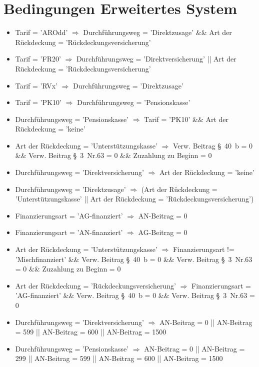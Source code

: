 \normalsize

\section{Bedingungen Erweitertes System}\label{sec:bedingungenComplex}

\footnotesize

\begin{itemize}
\item Tarif = 'AROdd' $\Rightarrow$ Durchführungsweg = 'Direktzusage' \&\& Art der Rückdeckung = 'Rückdeckungsversicherung'
\item Tarif = 'FR20' $\Rightarrow$ Durchführungsweg = 'Direktversicherung' || Art der Rückdeckung = 'Rückdeckungsversicherung'
\item Tarif = 'RVx' $\Rightarrow$ Durchführungsweg = 'Direktzusage'
\item Tarif = 'PK10' $\Rightarrow$ Durchführungsweg = 'Pensionskasse'
\item Durchführungsweg = 'Pensionskasse' $\Rightarrow$ Tarif = 'PK10' \&\& Art der Rückdeckung = 'keine'
\item Art der Rückdeckung = 'Unterstützungskasse' $\Rightarrow$ Verw. Beitrag §~40~b = 0 \&\& Verw. Beitrag §~3~Nr.63 = 0 \&\& Zuzahlung zu Beginn = 0
\item Durchführungsweg = 'Direktversicherung' $\Rightarrow$ Art der Rückdeckung = 'keine'
\item Durchführungsweg = 'Direktzusage' $\Rightarrow$ (Art der Rückdeckung = 'Unterstützungskasse' || Art der Rückdeckung = 'Rückdeckungsversicherung')
\item Finanzierungsart = 'AG-finanziert' $\Rightarrow$ AN-Beitrag = 0
\item Finanzierungsart = 'AN-finanziert' $\Rightarrow$ AG-Beitrag = 0
\item Art der Rückdeckung = 'Unterstützungskasse' $\Rightarrow$ Finanzierungsart != 'Mischfinanziert' \&\& Verw. Beitrag §~40~b = 0 \&\& Verw. Beitrag §~3~Nr.63 = 0 \&\& Zuzahlung zu Beginn = 0
\item Art der Rückdeckung = 'Rückdeckungsversicherung' $\Rightarrow$ Finanzierungsart = 'AG-finanziert' \&\& Verw. Beitrag §~40~b = 0 \&\& Verw. Beitrag §~3~Nr.63 = 0
\item Durchführungsweg = 'Direktversicherung' $\Rightarrow$ AN-Beitrag = 0 || AN-Beitrag = 599 || AN-Beitrag = 600 || AN-Beitrag = 1500
\item Durchführungsweg = 'Pensionskasse' $\Rightarrow$ AN-Beitrag = 0 || AN-Beitrag = 299 || AN-Beitrag = 599 || AN-Beitrag = 600 || AN-Beitrag = 1500

\end{itemize}
